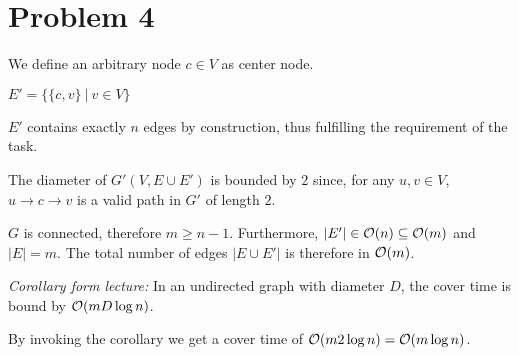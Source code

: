 \section*{Problem 4}

We define an arbitrary node $c \in V$ as center node.

$E' = \{\{c, v\} ~|~ v \in V\}$

$E'$ contains exactly $n$ edges by construction, thus fulfilling the requirement of the task.

The diameter of $G'(V, E \cup E')$ is bounded by $2$ since, for any $u, v \in V$, $u \rightarrow c \rightarrow v$ is a valid path in $G'$ of length $2$.

$G$ is connected, therefore $m \geq n - 1$. Furthermore, $|E'| \in \mathcal{O}(n) \subseteq \mathcal{O}(m)$ and $|E| = m$. The total number of edges $|E \cup E'|$ is therefore in $\mathcal{O}(m)$.

\textit{Corollary form lecture:} In an undirected graph with diameter $D$, the cover time is bound by $\mathcal{O}(mD\log n)$.

By invoking the corollary we get a cover time of $\mathcal{O}(m 2 \log n) = \mathcal{O}(m \log n)$.



\pagebreak 